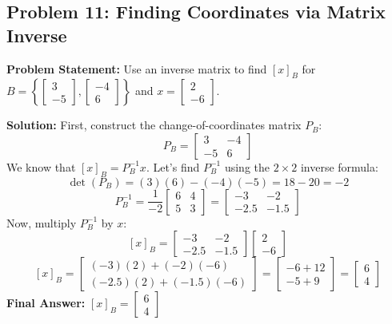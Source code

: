 \documentclass[11pt]{article}
\begin{document}
\subsection{Problem 11: Finding Coordinates via Matrix Inverse}
\textbf{Problem Statement:} Use an inverse matrix to find $[x]_B$ for $B = \left\{ \begin{bmatrix} 3 \\ -5 \end{bmatrix}, \begin{bmatrix} -4 \\ 6 \end{bmatrix} \right\}$ and $x = \begin{bmatrix} 2 \\ -6 \end{bmatrix}$.

\textbf{Solution:}
First, construct the change-of-coordinates matrix $P_B$:
\[ P_B = \begin{bmatrix} 3 & -4 \\ -5 & 6 \end{bmatrix} \]
We know that $[x]_B = P_B^{-1} x$. Let's find $P_B^{-1}$ using the $2 \times 2$ inverse formula:
\[ \det(P_B) = (3)(6) - (-4)(-5) = 18 - 20 = -2 \]
\[ P_B^{-1} = \frac{1}{-2} \begin{bmatrix} 6 & 4 \\ 5 & 3 \end{bmatrix} = \begin{bmatrix} -3 & -2 \\ -2.5 & -1.5 \end{bmatrix} \]
Now, multiply $P_B^{-1}$ by $x$:
\[ [x]_B = \begin{bmatrix} -3 & -2 \\ -2.5 & -1.5 \end{bmatrix} \begin{bmatrix} 2 \\ -6 \end{bmatrix} \]
\[ [x]_B = \begin{bmatrix} (-3)(2) + (-2)(-6) \\ (-2.5)(2) + (-1.5)(-6) \end{bmatrix} = \begin{bmatrix} -6 + 12 \\ -5 + 9 \end{bmatrix} = \begin{bmatrix} 6 \\ 4 \end{bmatrix} \]
\textbf{Final Answer:} $[x]_B = \begin{bmatrix} 6 \\ 4 \end{bmatrix}$
\end{document}
